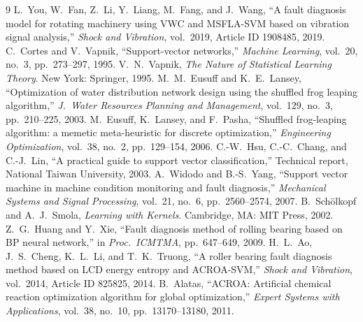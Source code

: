 \documentclass[11pt,a4paper]{article}
\begin{document}
\begin{thebibliography}{9}
L.~You, W.~Fan, Z.~Li, Y.~Liang, M.~Fang, and J.~Wang,
``A fault diagnosis model for rotating machinery using VWC and MSFLA-SVM based on vibration signal analysis,''
\textit{Shock and Vibration}, vol.~2019, Article ID 1908485, 2019.
C.~Cortes and V.~Vapnik,
``Support-vector networks,''
\textit{Machine Learning}, vol.~20, no.~3, pp.~273--297, 1995.
V.~N.~Vapnik,
\textit{The Nature of Statistical Learning Theory}.
New York: Springer, 1995.
M.~M.~Eusuff and K.~E.~Lansey,
``Optimization of water distribution network design using the shuffled frog leaping algorithm,''
\textit{J.\ Water Resources Planning and Management}, vol.~129, no.~3, pp.~210--225, 2003.
M.~Eusuff, K.~Lansey, and F.~Pasha,
``Shuffled frog-leaping algorithm: a memetic meta-heuristic for discrete optimization,''
\textit{Engineering Optimization}, vol.~38, no.~2, pp.~129--154, 2006.
C.-W.~Hsu, C.-C.~Chang, and C.-J.~Lin,
``A practical guide to support vector classification,''
Technical report, National Taiwan University, 2003.
A.~Widodo and B.-S.~Yang,
``Support vector machine in machine condition monitoring and fault diagnosis,''
\textit{Mechanical Systems and Signal Processing}, vol.~21, no.~6, pp.~2560--2574, 2007.
B.~Sch\"olkopf and A.~J.~Smola,
\textit{Learning with Kernels}.
Cambridge, MA: MIT Press, 2002.
Z.~G.~Huang and Y.~Xie,
``Fault diagnosis method of rolling bearing based on BP neural network,''
in \textit{Proc.\ ICMTMA}, pp.~647--649, 2009.
H.~L.~Ao, J.~S.~Cheng, K.~L.~Li, and T.~K.~Truong,
``A roller bearing fault diagnosis method based on LCD energy entropy and ACROA-SVM,''
\textit{Shock and Vibration}, vol.~2014, Article ID 825825, 2014.
B.~Alatas,
``ACROA: Artificial chemical reaction optimization algorithm for global optimization,''
\textit{Expert Systems with Applications}, vol.~38, no.~10, pp.~13170--13180, 2011.
\end{thebibliography}
\end{document}
